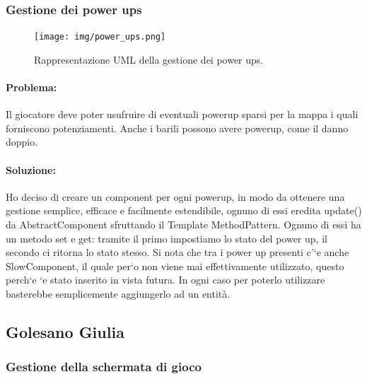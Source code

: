 \subsubsection{Gestione dei power ups}

\begin{figure}[H]
\centering{}
\texttt{[image: img/power\_ups.png]}
\caption{Rappresentazione UML della gestione dei power ups.}
\end{figure}

\paragraph{Problema:}
Il giocatore deve poter usufruire di eventuali powerup sparsi per la mappa i quali forniscono potenziamenti. Anche i barili possono avere powerup, come il danno doppio.

\paragraph{Soluzione:}
Ho deciso di creare un component per ogni powerup, in modo da ottenere una gestione semplice, efficace e facilmente estendibile, ognuno di essi eredita update() da AbstractComponent sfruttando il Template MethodPattern. Ognuno di essi ha un metodo set e get: tramite il primo impostiamo lo stato del power up, il secondo ci ritorna lo stato stesso. Si nota che tra i power up presenti c’`e anche SlowComponent, il quale per`o non viene mai effettivamente utilizzato, questo perch`e `e stato inserito in vista futura. In ogni caso per poterlo utilizzare basterebbe semplicemente aggiungerlo ad un entità.




\subsection{Golesano Giulia}

\subsubsection{Gestione della schermata di gioco }


